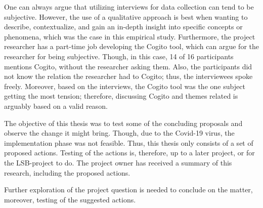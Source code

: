 One can always argue that utilizing interviews for data collection can tend to be subjective. However, the use of a qualitative approach is best when wanting to describe, contextualize, and gain an in-depth insight into specific concepts or phenomena, which was the case in this empirical study. Furthermore, the project researcher has a part-time job developing the Cogito tool, which can argue for the researcher for being subjective. Though, in this case, 14 of 16 participants mentions Cogito, without the researcher asking them. Also, the participants did not know the relation the researcher had to Cogito; thus, the interviewees spoke freely. Moreover, based on the interviews, the Cogito tool was the one subject getting the most tension; therefore, discussing Cogito and themes related is arguably based on a valid reason. 

The objective of this thesis was to test some of the concluding proposals and observe the change it might bring. Though, due to the Covid-19 virus, the implementation phase was not feasible. Thus, this thesis only consists of a set of proposed actions. Testing of the actions is, therefore, up to a later project, or for the LSB-project to do. The project owner has received a summary of this research, including the proposed actions. 

Further exploration of the project question is needed to conclude on the matter, moreover, testing of the suggested actions.
\cleardoublepage